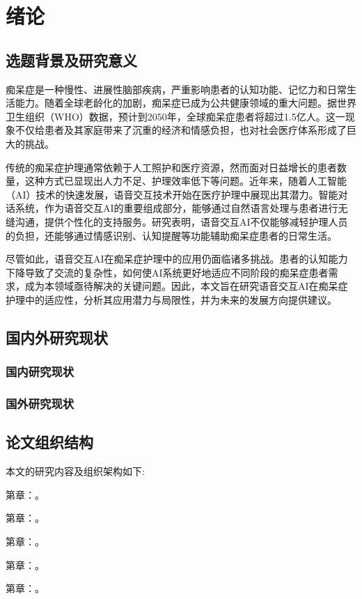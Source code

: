 
\chapter{绪论}
\label{c:01_introduction}


\section{选题背景及研究意义}

痴呆症是一种慢性、进展性脑部疾病，严重影响患者的认知功能、记忆力和日常生活能力。随着全球老龄化的加剧，痴呆症已成为公共健康领域的重大问题。据世界卫生组织（WHO）数据，预计到2050年，全球痴呆症患者将超过1.5亿人。这一现象不仅给患者及其家庭带来了沉重的经济和情感负担，也对社会医疗体系形成了巨大的挑战。

传统的痴呆症护理通常依赖于人工照护和医疗资源，然而面对日益增长的患者数量，这种方式已显现出人力不足、护理效率低下等问题。近年来，随着人工智能（AI）技术的快速发展，语音交互技术开始在医疗护理中展现出其潜力。智能对话系统，作为语音交互AI的重要组成部分，能够通过自然语言处理与患者进行无缝沟通，提供个性化的支持服务。研究表明，语音交互AI不仅能够减轻护理人员的负担，还能够通过情感识别、认知提醒等功能辅助痴呆症患者的日常生活。

尽管如此，语音交互AI在痴呆症护理中的应用仍面临诸多挑战。患者的认知能力下降导致了交流的复杂性，如何使AI系统更好地适应不同阶段的痴呆症患者需求，成为本领域亟待解决的关键问题。因此，本文旨在研究语音交互AI在痴呆症护理中的适应性，分析其应用潜力与局限性，并为未来的发展方向提供建议。\cite{hochr1997longshort, kapla2020scalingla}


\section{国内外研究现状}

\subsection{国内研究现状}

\subsection{国外研究现状}




\section{论文组织结构}

本文的研究内容及组织架构如下: 

第章：。

第章：。

第章：。

第章：。

第章：。





